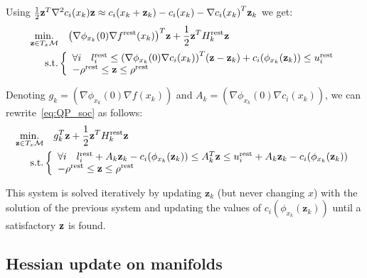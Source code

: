 Using $ \frac{1}{2}{\bf z}^T{\nabla}^2c_i(x_k){\bf z} \approx c_i(x_k+{\bf z}_k) - c_i(x_k) - {\nabla c_i(x_k)}^T {\bf z}_k $
we get:
\begin{align}
  \label{eq:QP_soc}
  \begin{split}
  \operatorname*{min.}_{\mathbf{z} \in T_x\mathcal{M} } &\quad {\left(\nabla\phi_{x_k}(0) \nabla f^\text{rest} (x_k)\right)}^T\mathbf{z} + \frac{1}{2} {\bf z }^T H^\text{rest}_k{\bf z }\\
  \text{s.t.}&\left\{
  \begin{array}{lr}
    \forall i \quad l^\text{rest}_i \leq {\left(\nabla\phi_{x_k}(0) \nabla c_i (x_k)\right)}^T(\mathbf{z} - \mathbf{z}_k) + c_i(\phi_{x_k}({\bf z}_k)) \leq u^\text{rest}_i \\
    -\rho^\text{rest} \leq \mathbf{z} \leq \rho^\text{rest} \\
  \end{array}\right.
  \end{split}
\end{align}

Denoting $g_k = {\left(\nabla\phi_{x_k}(0) \nabla f (x_k)\right)}$ and $A_k = {\left(\nabla\phi_{x_k}(0) \nabla c_i (x_k)\right)}$, we can rewrite~\ref{eq:QP_soc} as follows:
\begin{align}
  \label{eq:QP_soc_simple}
  \begin{split}
  \operatorname*{min.}_{\mathbf{z} \in T_x\mathcal{M} }& \quad g_k^T\mathbf{z} + \frac{1}{2} {\bf z }^T H^\text{rest}_k{\bf z }\\
  \text{s.t.}&\left\{
  \begin{array}{lr}
    \forall i \quad l^\text{rest}_i + A_k\mathbf{z}_k - c_i(\phi_{x_k}({\bf z}_k)) \leq A_k^T\mathbf{z}\leq u^\text{rest}_i+ A_k\mathbf{z}_k - c_i(\phi_{x_k}({\bf z}_k))  \\
    -\rho^\text{rest} \leq \mathbf{z} \leq \rho^\text{rest} \\
  \end{array}\right.
  \end{split}
\end{align}

This system is solved iteratively by updating $\mathbf{z}_k$ (but never changing $x$) with the solution of the previous system and updating the values of $c_i(\phi_{x_k}(\mathbf{z}_k))$ until a satisfactory $\bf z$ is found.

\subsection{Hessian update on manifolds}
\label{sub:hessian_update_on_manifolds}

